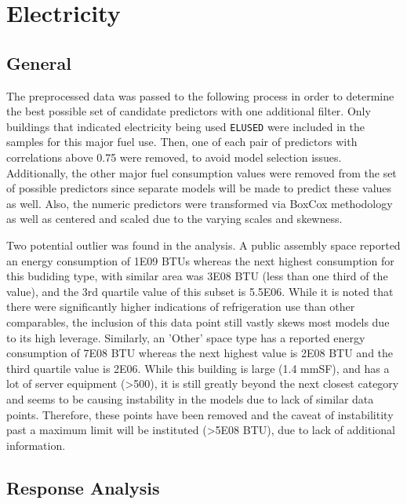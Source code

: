 \section*{Electricity}
\label{sec:electricity}

\subsection{General}

The preprocessed data was passed to the following process in order to determine the best possible set of candidate predictors with one additional filter.  Only buildings that indicated electricity being used \lstinline{ELUSED} were included in the samples for this major fuel use.  Then, one of each pair of predictors with correlations above 0.75 were removed, to avoid model selection issues. Additionally, the other major fuel consumption values were removed from the set of possible predictors since separate models will be made to predict these values as well.  Also, the numeric predictors were transformed via BoxCox methodology as well as centered and scaled due to the varying scales and skewness.

Two potential outlier was found in the analysis. A public assembly space reported an energy consumption of 1E09 BTUs whereas the next highest consumption for this budiding type, with similar area was  3E08 BTU (less than one third of the value), and the 3rd quartile value of this subset is 5.5E06.  While it is noted that there were significantly higher indications of refrigeration use than other comparables, the inclusion of this data point still vastly skews most models due to its high leverage.  Similarly, an 'Other' space type has a reported energy consumption of 7E08 BTU whereas the next highest value is 2E08 BTU and the third quartile value is 2E06.  While this building is large (1.4 mmSF), and has a lot of server equipment (>500), it is still greatly beyond the next closest category and seems to be causing instability in the models due to lack of similar data points.  Therefore, these points have been removed and the caveat of instabilitity past a maximum limit will be instituted (>5E08 BTU), due to lack of additional information.

\subsection{Response Analysis}

